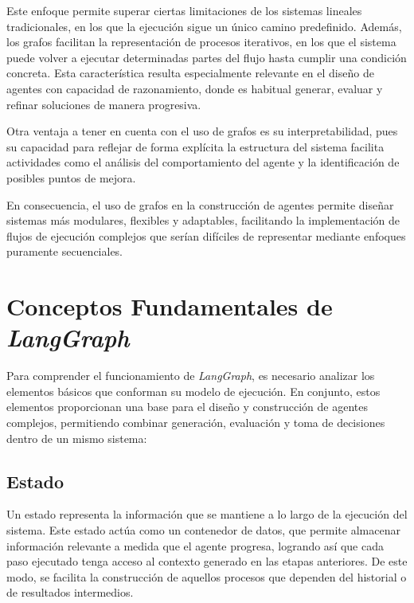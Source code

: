 \documentclass[12pt,a4paper,twoside,openright]{book}
\begin{document}
Este enfoque permite superar ciertas limitaciones de los sistemas lineales tradicionales, en los que la ejecución sigue un único camino predefinido. Además,
los grafos facilitan la representación de procesos iterativos, en los que el sistema puede volver a ejecutar determinadas partes del flujo hasta cumplir una
condición concreta. Esta característica resulta especialmente relevante en el diseño de agentes con capacidad de razonamiento, donde es habitual generar, evaluar
y refinar soluciones de manera progresiva. \cite{bondy1976graph}

Otra ventaja a tener en cuenta con el uso de grafos es su interpretabilidad, pues su capacidad para reflejar de forma explícita la estructura
del sistema facilita actividades como el análisis del comportamiento del agente y la identificación de posibles puntos de mejora.

En consecuencia, el uso de grafos en la construcción de agentes permite diseñar sistemas más modulares, flexibles y adaptables, facilitando la implementación
de flujos de ejecución complejos que serían difíciles de representar mediante enfoques puramente secuenciales.


\section{Conceptos Fundamentales de \emph{LangGraph}}

Para comprender el funcionamiento de \emph{LangGraph}, es necesario analizar los elementos básicos que conforman su modelo de ejecución.
En conjunto, estos elementos proporcionan una base para el diseño y construcción de agentes complejos, permitiendo combinar generación, evaluación y toma
de decisiones dentro de un mismo sistema:

\subsection{Estado}

Un estado representa la información que se mantiene a lo largo de la ejecución del sistema. Este estado actúa como un contenedor de datos, que permite almacenar
información relevante a medida que el agente progresa, logrando así que cada paso ejecutado tenga acceso al contexto generado en las etapas anteriores.
De este modo, se facilita la construcción de aquellos procesos que dependen del historial o de resultados intermedios.
\end{document}
